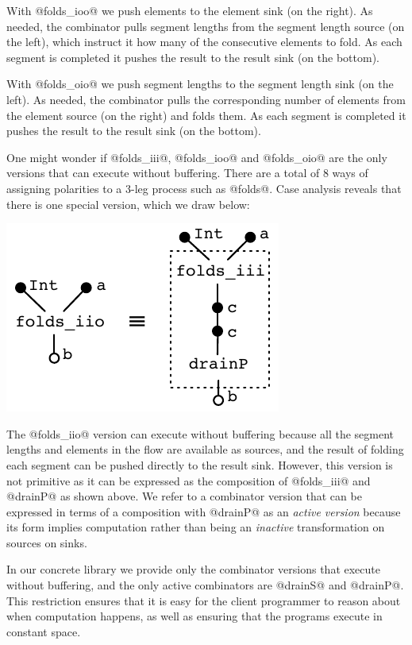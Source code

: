 With @folds_ioo@ we push elements to the element sink (on the right). As needed, the combinator pulls segment lengths from the segment length source (on the left), which instruct it how many of the consecutive elements to fold. As each segment is completed it pushes the result to the result sink (on the bottom).

With @folds_oio@ we push segment lengths to the segment length sink (on the left). As needed, the combinator pulls the corresponding number of elements from the element source (on the right) and folds them. As each segment is completed it pushes the result to the result sink (on the bottom). 

One might wonder if @folds_iii@, @folds_ioo@ and @folds_oio@ are the only versions that can execute without buffering. There are a total of 8 ways of assigning polarities to a 3-leg process such as @folds@. Case analysis reveals that there is one special version, which we draw below:

\vspace{-0.5em}
\begin{center}
\includegraphics[scale=0.8]{figures/folds-drain.pdf}
\end{center}
\vspace{-1em}
The @folds_iio@ version can execute without buffering because all the segment lengths and elements in the flow are available as sources, and the result of folding each segment can be pushed directly to the result sink. However, this version is not primitive as it can be expressed as the composition of @folds_iii@ and @drainP@ as shown above. We refer to a combinator version that can be expressed in terms of a composition with @drainP@ as an \emph{active version} because its form implies computation rather than being an \emph{inactive} transformation on sources on sinks.

In our concrete library we provide only the combinator versions that execute without buffering, and the only active combinators are @drainS@ and @drainP@. This restriction ensures that it is easy for the client programmer to reason about when computation happens, as well as ensuring that the programs execute in constant space.

